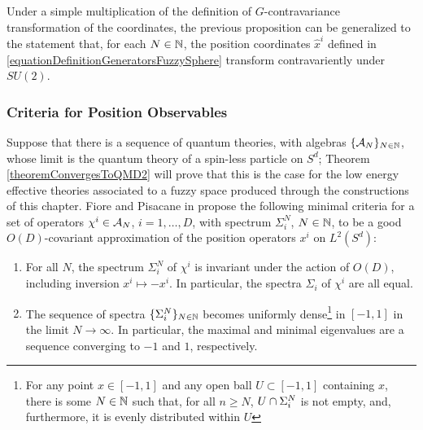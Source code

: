 Under a simple multiplication of the definition of $G$-contravariance transformation of the coordinates, the previous proposition can be generalized to the statement that, for each $N \in \mathbb{N}$, the position coordinates $\hat x^i$ defined in \eqref{equationDefinitionGeneratorsFuzzySphere} transform contravariently under $SU(2)$.

\lin

\subsubsection{Criteria for Position Observables}\label{subsectionCriteriaGOodApproximationsOfPosition}

Suppose that there is a sequence of quantum theories, with algebras $\{\mathcal A_N\}_{N \in \mathbb{N}}$, whose limit is the quantum theory of a spin-less particle on $S^d$; Theorem \ref{theoremConvergesToQMD2} will prove that this is the case for the low energy effective theories associated to a fuzzy space produced through the constructions of this chapter. Fiore and Pisacane in \cite{FioreXi2020} propose the following minimal criteria for a set of operators $\chi^i \in \mathcal A_N$, $i = 1, \dots, D$, with spectrum $\Sigma^N_i$, $N \in \mathbb{N}$, to be a good $O(D)$-covariant approximation of the position operators $x^i$ on $L^2(S^d)$:
    \begin{enumerate}
    
    \item For all $N$, the spectrum $\Sigma^N_i$ of $\chi^i$ is invariant under the action of $O(D)$, including inversion $x^i \mapsto -x^i$. In particular, the spectra $\Sigma_i$ of $\chi^i$ are all equal.
    
    \item The sequence of spectra $\{\Sigma_i^N\}_{N \in \mathbb{N}}$ becomes uniformly dense\footnote{For any point $x \in [-1, 1]$ and any open ball $U \subset [-1, 1]$ containing $x$, there is some $N \in \mathbb{N}$ such that, for all $n \geq N$, $U \cap \Sigma_i^N$ is not empty, and, furthermore, it is evenly distributed within $U$} in $[-1, 1]$ in the limit $N \to \infty$. In particular, the maximal and minimal eigenvalues are a sequence converging to $-1$ and $1$, respectively.
    
    \end{enumerate}

